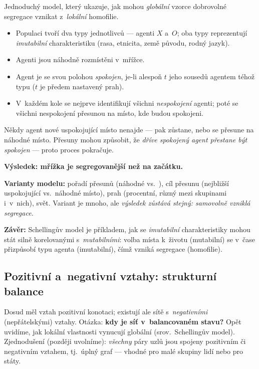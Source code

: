 \documentclass[11pt,a4paper]{article}
\theoremstyle{definition}
\begin{document}
\begin{defbox}
Jednoduchý model, který ukazuje, jak mohou \emph{globální} vzorce dobrovolné segregace vznikat
z~\emph{lokální} homofilie.
\begin{itemize}
\item Populaci tvoří dva typy jednotlivců --- agenti $X$ a~$O$; oba typy reprezentují
      \emph{imutabilní} charakteristiku (rasa, etnicita, země původu, rodný jazyk).
\item Agenti jsou náhodně rozmístěni v~mřížce.
\item Agent je se svou polohou \emph{spokojen}, je-li alespoň $t$ jeho sousedů agentem téhož
      typu ($t$ je předem nastavený prah).
\item V~každém kole se nejprve identifikují všichni \emph{nespokojení} agenti; poté se všichni
      nespokojení přesunou na místo, kde budou spokojeni.
\end{itemize}
Někdy agent nové uspokojující místo nenajde --- pak zůstane, nebo se přesune na náhodné místo.
Přesuny mohou způsobit, že \emph{dříve spokojený agent přestane být spokojen} --- proto proces
pokračuje.

\textbf{Výsledek: mřížka je segregovanější než na začátku.}

\textbf{Varianty modelu:} pořadí přesunů (náhodné vs.\ ), cíl přesunu (nejbližší
uspokojující vs.\ náhodné místo), prah (procentní, různý mezi skupinami i~v~nich), 
svět. Variant je mnoho, ale \emph{výsledek zůstává stejný: samovolně vzniklá segregace.}

\textbf{Závěr:} Schellingův model je příkladem, jak se \emph{imutabilní} charakteristiky mohou
stát silně korelovanými s~\emph{mutabilními}: volba místa k~životu (mutabilní) se v~čase
přizpůsobí typu agenta (imutabilní), čímž vzniká segregace (homofilie).
\end{defbox}

\subsection{Pozitivní a~negativní vztahy: strukturní balance}

Dosud měl vztah pozitivní konotaci; existují ale sítě s~\emph{negativními} (nepřátelskými)
vztahy. Otázka: \textbf{kdy je síť v~balancovaném stavu?} Opět uvidíme, jak lokální vlastnosti
vynucují globální (srov.\ Schellingův model). Zjednodušení (později uvolníme): \emph{všechny}
páry uzlů jsou spojeny pozitivním či negativním vztahem, tj.\ úplný graf --- vhodné pro malé
skupiny lidí nebo pro státy.
\end{document}
